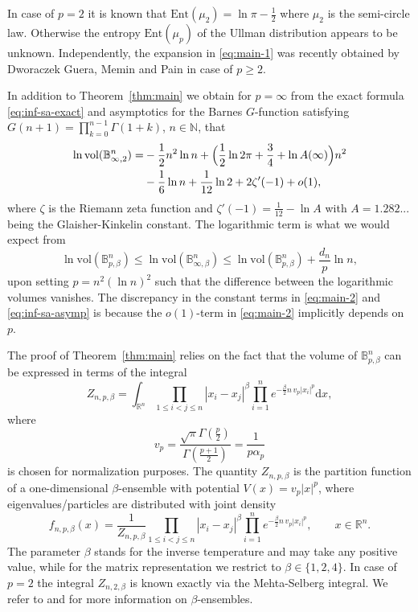 \documentclass[a4paper,12pt,reqno]{amsart}
\theoremstyle{definition}
\newcommand{\IB}{\mathbb{B}}
\newcommand{\IN}{\mathbb{N}}
\newcommand{\IR}{\mathbb{R}}
\newcommand{\Ent}{\mathrm{Ent}}
\newcommand{\vol}{\mathrm{vol}}
\newcommand{\dd}{\mathrm{d}}
\newcommand{\bpb}{\mathbb{B}_{p,\beta}^n}
\begin{document}
In case of $p=2$ it is known that $\Ent(\mu_2)=\ln \pi -\frac{1}{2}$ where $\mu_2$ is the semi-circle law. Otherwise the entropy $\Ent(\mu_p)$ of the Ullman distribution appears to be unknown. Independently, the expansion in \eqref{eq:main-1} was recently obtained by Dworaczek Guera, Memin and Pain \cite{GMP25} in case of $p\ge 2$. 

In addition to Theorem~\ref{thm:main} we obtain for $p=\infty$ from the exact formula \eqref{eq:inf-sa-exact} and asymptotics for the Barnes $G$-function satisfying $G(n+1)=\prod_{k=0}^{n-1}\Gamma(1+k)$, $n\in \IN$, that
\begin{align}\label{eq:inf-sa-asymp}
\ln \vol(\IB_{\infty,2}^n)
=&-\frac{1}{2}n^2\ln n 
+\Big(\frac{1}{2}\ln 2\pi +\frac{3}{4}+\ln A(\infty)\Big)n^2\notag\\
&-\frac{1}{6}\ln n +\frac{1}{12}\ln 2+2\zeta'(-1)+o(1),
\end{align}
where $\zeta$ is the Riemann zeta function and $\zeta'(-1)=\frac{1}{12}-\ln A$ with $A=1.282...$ being the Glaisher-Kinkelin constant. The logarithmic term is what we would expect from 
\[
\ln \vol(\IB_{p,\beta}^n)
\le \ln \vol(\IB_{\infty,\beta}^n)
\le \ln \vol(\IB_{p,\beta}^n)+\frac{d_n}{p}\ln n,
\]
upon setting $p=n^2(\ln n)^{2}$ such that the difference between the logarithmic volumes vanishes. The discrepancy in the constant terms in \eqref{eq:main-2} and \eqref{eq:inf-sa-asymp} is because the $o(1)$-term in \eqref{eq:main-2} implicitly depends on $p$.



The proof of Theorem~\ref{thm:main} relies on the fact that the volume of $\bpb$ can be expressed in terms of the integral
\begin{equation} \label{eq:Z}
Z_{n,p,\beta}
=\int_{\IR^n}\prod_{1\le i<j\le n}|x_i-x_j|^{\beta} \prod_{i=1}^n e^{-\frac{\beta}{2}n\, v_p|x_i|^p}\dd x,
\end{equation}
where
\[
v_p =\frac{\sqrt{\pi}\Gamma(\frac{p}{2})}{\Gamma(\frac{p+1}{2})}=\frac{1}{p\alpha_p}
\]
is chosen for normalization purposes. The quantity $Z_{n,p,\beta}$ is the partition function of a one-dimensional $\beta$-ensemble with potential $V(x)=v_p |x|^p$, where eigenvalues/particles are distributed with joint density 
\begin{equation} \label{eq:density}
f_{n,p,\beta}(x)
=\frac{1}{Z_{n,p,\beta}}\prod_{1\le i<j\le n}|x_i-x_j|^{\beta} \prod_{i=1}^n e^{-\frac{\beta}{2}n\, v_p|x_i|^p}, \qquad x\in \IR^n.
\end{equation}
The parameter $\beta$ stands for the inverse temperature and may take any positive value, while for the matrix representation we restrict to $\beta\in \{1,2,4\}$. In case of $p=2$ the integral $Z_{n,2,\beta}$ is known exactly via the Mehta-Selberg integral. We refer to \cite{AGZ10} and \cite{For10} for more information on $\beta$-ensembles. 
\end{document}
